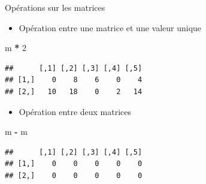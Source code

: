 \documentclass[
  ignorenonframetext,
]{beamer}
\newenvironment{Shaded}{\begin{snugshade}}{\end{snugshade}}
\newcommand{\DecValTok}[1]{\textcolor[rgb]{0.00,0.00,0.81}{#1}}
\newcommand{\NormalTok}[1]{#1}
\newcommand{\SpecialCharTok}[1]{\textcolor[rgb]{0.81,0.36,0.00}{\textbf{#1}}}
\providecommand{\tightlist}{%
  \setlength{\itemsep}{0pt}\setlength{\parskip}{0pt}}
\begin{document}
\begin{frame}[fragile]{Opérations sur les matrices}
\protect\hypertarget{opuxe9rations-sur-les-matrices}{}
\begin{itemize}
\tightlist
\item
  Opération entre une matrice et une valeur unique
\end{itemize}

\tiny

\begin{Shaded}
\begin{Highlighting}[]
\NormalTok{m }\SpecialCharTok{*} \DecValTok{2}
\end{Highlighting}
\end{Shaded}

\begin{verbatim}
##      [,1] [,2] [,3] [,4] [,5]
## [1,]    0    8    6    0    4
## [2,]   10   18    0    2   14
\end{verbatim}

\normalsize

\begin{itemize}
\tightlist
\item
  Opération entre deux matrices
\end{itemize}

\tiny

\begin{Shaded}
\begin{Highlighting}[]
\NormalTok{m }\SpecialCharTok{{-}}\NormalTok{ m}
\end{Highlighting}
\end{Shaded}

\begin{verbatim}
##      [,1] [,2] [,3] [,4] [,5]
## [1,]    0    0    0    0    0
## [2,]    0    0    0    0    0
\end{verbatim}

\normalsize
\end{frame}
\end{document}
